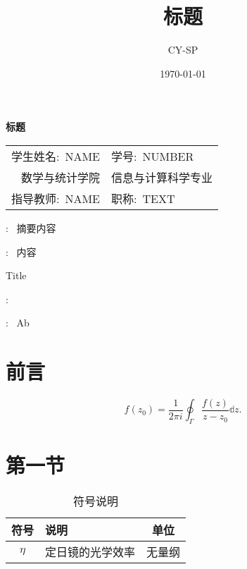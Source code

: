 \documentclass[UTF8,heading=true,12pt,font=songti]{article}
\title{\songti \zihao{3}\bfseries 标题}
\author{CY-SP}
\date{\today}
\begin{document}
    
    \newpage
    \tableofcontents%
    \setcounter{page}{0}%
    \thispagestyle{empty}%
    \newpage
    \begin{center}
    \songti {}\bfseries 标题
	\end{center}

    \begin{table}[H]
        \vspace{-1.5em}
        \centering
        \begin{spacing}{1.5}
        \songti {}
        \begin{tabular}{rl} %
            学生姓名:\ NAME & 学号:\ NUMBER\\ 
            数学与统计学院 & 信息与计算科学专业\\
            指导教师:\ NAME & 职称:\ TEXT\\	
        \end{tabular}
        \end{spacing}
        \vspace{-1.5em}
    \end{table}
	
    : \kaishu{} \ 摘要内容 %


    :\kaishu{} \ 内容 %
    
    \begin{center}
    	 Title
    \end{center}
    :\  \lipsum[1]
    
    :\  Ab
    
    \section{前言}
	$$
    f(z_0)=\frac{1}{2\pi i}\oint_{\Gamma}\frac{f(z)}{z-z_0}\mathbb{d}z.
    $$

    \section{第一节}
    \lipsum[3]
    \begin{table}[H]
        \centering
        \caption{符号说明}
        \begin{tabular}{clc} %
            \hline
            \textbf{符号} & \textbf{说明} & \textbf{单位} \\ \hline
            $\eta$ & 定日镜的光学效率 & 无量纲\\	
            \hline
        \end{tabular}
    \end{table}
\end{document}
